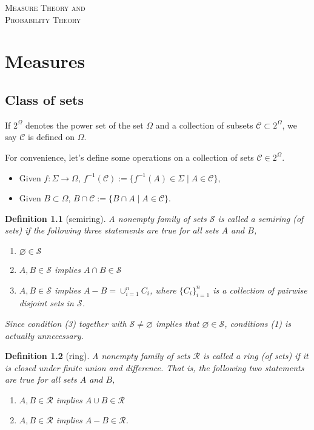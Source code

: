 \documentclass{report}
\newtheorem{definition}{Definition}[section]
\theoremstyle{nonumberplain}
\begin{document}
\begin{center}
	\textsc{\Huge Measure Theory and}
	~\\
	\vspace{1em}  
	\textsc{\Huge Probability Theory}	
\end{center}
\vspace{1em} 
\tableofcontents
\chapter{Measures}
\section{Class of sets}
If $2^\Omega$ denotes the power set of the set $\Omega$ and a collection of subsets $\mathcal{C}\subset2^\Omega$, we say $\mathcal{C}$ is defined on $\Omega$.

For convenience, let's define some operations on a collection of sets $\mathcal{C}\in 2^{\Omega}$.
\begin{itemize}
	\item Given $f:\Sigma\to\Omega$, $f^{-1}(\mathcal{C}):=\{f^{-1}(A)\in\Sigma\mid A\in\mathcal{C}\}$,
	\item Given $B\subset \Omega$, $B\cap \mathcal{C}:=\{B\cap A\mid A\in\mathcal{C}\}$.
\end{itemize}
\begin{definition}[semiring]
	A nonempty family of sets $\mathcal{S}$ is called a \emph{semiring (of sets)} if the following three statements are true for all sets $A$ and $B$,
	\begin{enumerate}[(1)]
		\item $\varnothing\in \mathcal{S}$
		\item $A,B\in \mathcal{S}$ implies $A\cap B\in\mathcal{S}$ 
		\item $A,B\in \mathcal{S}$ implies $A-B=\cup_{i=1}^n C_i$, where $\{C_{i}\}_{i=1}^{n}$ is a collection of pairwise disjoint sets in $\mathcal{S}$.
	\end{enumerate}	
	Since condition (3) together with $\mathcal{S} \neq \varnothing$ implies that $\varnothing \in \mathcal{S}$, conditions (1) is actually unnecessary.
\end{definition}

\begin{definition}[ring]
	A nonempty family of sets $\mathcal{R}$ is called a \emph{ring (of sets)} if it is closed under finite union and difference. That is, the following two statements are true for all sets $A$ and $B$,
	\begin{enumerate}[(1)]
	\item $A,B\in \mathcal{R}$ implies $A\cup B\in\mathcal{R}$ 
	\item $A,B\in \mathcal{R}$ implies $A-B\in\mathcal{R}$.
	\end{enumerate}	
\end{definition}
\end{document}
